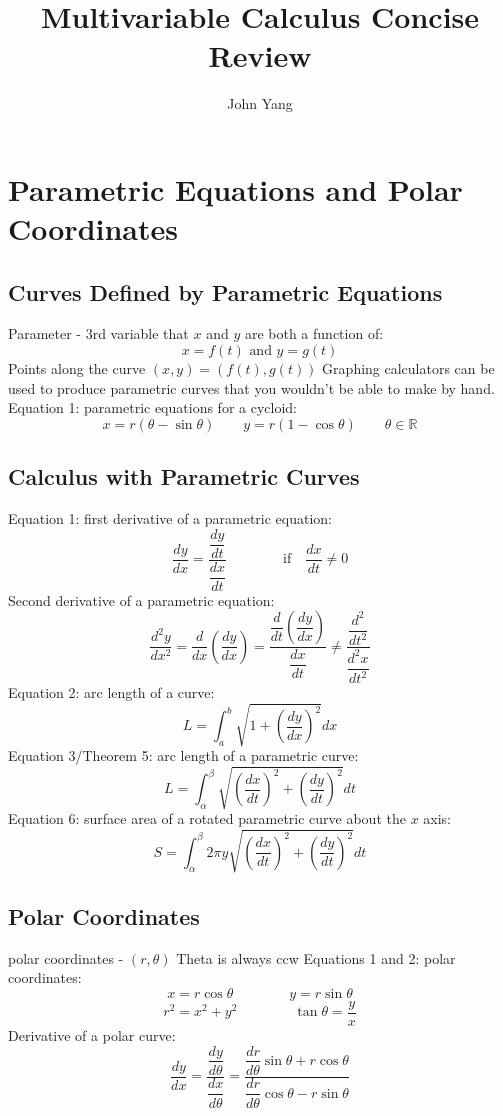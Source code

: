 \documentclass{article}
\title{Multivariable Calculus Concise Review} %
\author{John Yang}
\begin{document}
    \maketitle
    \tableofcontents\newpage
    
    \section{Parametric Equations and Polar Coordinates} %
    
    \subsection{Curves Defined by Parametric Equations} %
    \begin{outline}
        \1 Parameter - 3rd variable that $x$ and $y$ are both a function of: \[x=f(t)\text{ and }y=g(t)\]
        \1 Points along the curve \((x,y)=(f(t),g(t))\)
        \1 Graphing calculators can be used to produce parametric curves that you wouldn't be able to make by hand. 
        \1 Equation 1: parametric equations for a cycloid: \[x=r(\theta-\sin\theta) \qquad y=r(1-\cos\theta) \qquad \theta\in\mathbb{R}\]
    \end{outline}
    \subsection{Calculus with Parametric Curves}
    \begin{outline}
        \1 Equation 1: first derivative of a parametric equation: \[\dfrac{dy}{dx}=\dfrac{\dfrac{dy}{dt}}{\dfrac{dx}{dt}}\qquad\qquad\text{if}\quad\dfrac{dx}{dt}\neq0\]
        \1 Second derivative of a parametric equation: \[\dfrac{d^2y}{dx^2}=\dfrac{d}{dx}\left(\dfrac{dy}{dx}\right)=\dfrac{\dfrac{d}{dt}\left(\dfrac{dy}{dx}\right)}{\dfrac{dx}{dt}}\neq\dfrac{\dfrac{d^2}{dt^2}}{\dfrac{d^2x}{dt^2}}\]
        \1 Equation 2: arc length of a curve: \[L=\int^b_a\sqrt{1+\left(\dfrac{dy}{dx}\right)^2}dx\]
        \1 Equation 3/Theorem 5: arc length of a parametric curve: \[L=\int^\beta_\alpha\sqrt{\left(\dfrac{dx}{dt}\right)^2+\left(\dfrac{dy}{dt}\right)^2}dt\]
        \1 Equation 6: surface area of a rotated parametric curve about the $x$ axis: \[S=\int^\beta_\alpha2\pi y\sqrt{\left(\dfrac{dx}{dt}\right)^2+\left(\dfrac{dy}{dt}\right)^2}dt\]

    \end{outline}
    \subsection{Polar Coordinates}
    \begin{outline}
        \1 polar coordinates - \((r,\theta)\)
        \1 Theta is always ccw 
        \1 Equations 1 and 2: polar coordinates: \[x=r\cos\theta\qquad\qquad y=r\sin\theta\]\[r^2=x^2+y^2\qquad\qquad\tan\theta=\dfrac{y}{x}\]
        \1 Derivative of a polar curve: \[\dfrac{dy}{dx}=\dfrac{\dfrac{dy}{d\theta}}{\dfrac{dx}{d\theta}}=\dfrac{\dfrac{dr}{d\theta}\sin\theta+r\cos\theta}{\dfrac{dr}{d\theta}\cos\theta-r\sin\theta}\]
    \end{outline}
\end{document}
